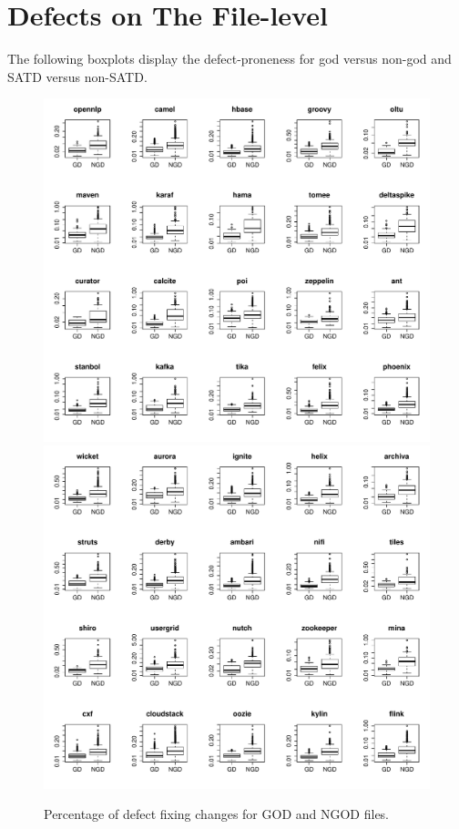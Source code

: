 \chapter{Defects on The File-level}
The following boxplots display the defect-proneness for god versus non-god and SATD versus non-SATD.

\begin{figure}[tb]
	\centering
	\includegraphics[width=120mm]{figures/chapter4/RQ1_boxplots_god_1}
	\includegraphics[width=120mm]{figures/chapter4/RQ1_boxplots_god_2}
	\caption{Percentage of defect fixing changes for GOD and NGOD files.}
	\label{figure:percentage_of_defects_god_vs_ngod}
\end{figure}



